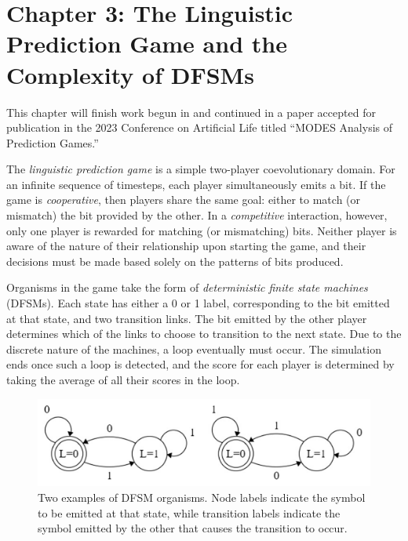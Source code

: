 \documentclass{article}
\begin{document}
\section*{Chapter 3: The Linguistic Prediction Game and the Complexity of DFSMs}

This chapter will finish work begun in \citet{moran2019evolving} and continued in a paper 
accepted for publication in the 2023 Conference on Artificial Life titled 
``MODES Analysis of Prediction Games.'' 

The \textit{linguistic prediction game} is a simple two-player coevolutionary domain. 
For an infinite sequence of timesteps, each player simultaneously emits a bit. If the game is \textit{cooperative}, then players share 
the same goal: either to match (or mismatch) the bit provided by the other. 
In a \textit{competitive} interaction, however, only one player is rewarded for matching 
(or mismatching) bits. Neither player is aware of the nature of their relationship upon starting
the game, and their decisions must be made based solely on the patterns of bits produced.
 
Organisms in the game take the form of \textit{deterministic finite state machines} (DFSMs). 
Each state has either a 0 or 1 label, corresponding to the bit emitted at that state, and two 
transition links. The bit emitted by the other player determines which of the links to choose to 
transition to the next state. Due to the discrete nature of the machines, a loop eventually must 
occur. The simulation ends once such a loop is detected, and the score for each player is 
determined by taking the average of all their scores in the loop.

\begin{figure}[H]
    \begin{center}
        \includegraphics[width=4.5in]{dfsm.png}
        \caption{Two examples of DFSM organisms. Node labels indicate the symbol to be emitted 
        at that state, while transition labels indicate the symbol emitted by the other 
        that causes the transition to occur.}
        \label{dfsm}
    \end{center}
\end{figure}
\end{document}
